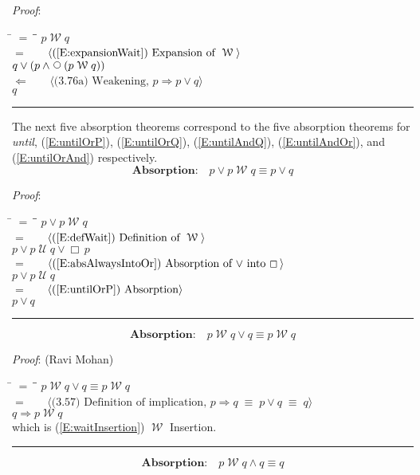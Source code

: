 \documentclass[12pt, fleqn, leqno]{article}
\newcommand{\lgap}{2pt}                             %
\newcommand{\mymathindent}{24pt}                    %
\newcommand{\equivs}{\ensuremath{\;\equiv\;}}       %
\newcommand{\impl}{\ensuremath{\Rightarrow}}        %
\newcommand{\foll}{\ensuremath{\Leftarrow}}         %
\newcommand{\Until}{\;\mathcal{U}\;}
\newcommand{\Wait}{\;\mathcal{W}\;}
\newcommand{\Next}{\;\,\text{\raisebox{3.5pt}{\circle{6}}}}
\newcommand{\Always}{\Box\,}
\newcommand{\myqed}{\rule[-.23ex]{1.2ex}{2.0ex}}
\newcommand{\myqedtab}{\hspace{384pt}}              %
\newcommand{\Gll} {\langle}                         %
\newcommand{\Ggg} {\rangle}                         %
\newcommand{\Hint}[1]     {\ \ \ $\Gll              \mbox{#1} \Ggg$ }   %
\begin{document}
\emph{Proof}:
\begin{tabbing}
\hspace{\mymathindent} \= $= \;$ \= \myqedtab \= \kill
\> \> $p \Wait q$\\[\lgap]
\> $=$ \> \Hint{(\ref{E:expansionWait}) Expansion of $\Wait$} \\[\lgap]
\> \> $q \lor (p \land \Next(p \Wait q))$\\[\lgap]
\> $\foll$ \> \Hint{(3.76a) Weakening, $p\impl p\lor q$} \\[\lgap]
\> \> $q$ \quad \myqed
\end{tabbing}

The next five absorption theorems correspond to the five absorption theorems for \textit{until},
(\ref{E:untilOrP}),
(\ref{E:untilOrQ}),
(\ref{E:untilAndQ}),
(\ref{E:untilAndOr}),
and
(\ref{E:untilOrAnd})
respectively.
\begin{equation}\label{E:waitOrP}
\textbf{Absorption:}\quad p\lor p\Wait q\equiv p\lor q
\end{equation}

\emph{Proof}:
\begin{tabbing}
\hspace{\mymathindent} \= $= \;$ \= \myqedtab \= \kill
\> \> $p\lor p\Wait q$\\[\lgap]
\> $=$ \> \Hint{(\ref{E:defWait}) Definition of $\Wait$} \\[\lgap]
\> \> $p\lor p \Until q\lor \Always p$\\[\lgap]
\> $=$ \> \Hint{(\ref{E:absAlwaysIntoOr}) Absorption of $\lor$ into $\Always$} \\[\lgap]
\> \> $p\lor p \Until q$\\[\lgap]
\> $=$ \> \Hint{(\ref{E:untilOrP}) Absorption} \\[\lgap]
\> \> $p\lor q$ \quad \myqed
\end{tabbing}
\begin{equation}\label{E:waitOrQ}
\textbf{Absorption:}\quad p\Wait q\lor q\equiv p\Wait q
\end{equation}

\emph{Proof}: (Ravi Mohan)
\begin{tabbing}
\hspace{\mymathindent} \= $= \;$ \= \myqedtab \= \kill
\> \> $p\Wait q\lor q\equiv p\Wait q$\\[\lgap]
\> $=$ \> \Hint{(3.57) Definition of implication, $p\impl q\equivs p\lor q \equivs q$} \\[\lgap]
\> \> $q\impl p\Wait q$\\[\lgap]
\> which is (\ref{E:waitInsertion}) $\Wait$ Insertion. \quad \myqed
\end{tabbing}
\begin{equation}\label{E:waitAndQ}
\textbf{Absorption:}\quad p\Wait q\land q\equiv q
\end{equation}
\end{document}
